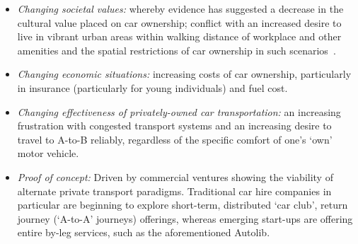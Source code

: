 \documentclass[journal]{IEEEtran}
\begin{document}
\begin{itemize}
\item {\emph{Changing societal values:}} whereby evidence has
suggested a decrease in the cultural value placed on car ownership;
conflict with an increased desire to live in vibrant urban areas
within walking distance of workplace and other amenities and the
spatial restrictions of car ownership in such
scenarios~\cite{jenks+burgess:2011}.
\item {\emph{Changing economic situations:}} increasing costs of car
ownership, particularly in insurance (particularly for young
individuals) and fuel cost.
\item {\emph{Changing effectiveness of privately-owned car
transportation:}} an increasing frustration with congested transport
systems and an increasing desire to travel to A-to-B reliably,
regardless of the specific comfort of one's `own' motor vehicle.
\item {\emph{Proof of concept:}} Driven by commercial ventures
showing the viability of alternate private transport
paradigms. Traditional car hire companies in particular are beginning
to explore short-term, distributed `car club', return journey
(`A-to-A' journeys) offerings, whereas emerging start-ups are offering
entire by-leg services, such as the aforementioned Autolib.
\end{itemize}




\end{document}
